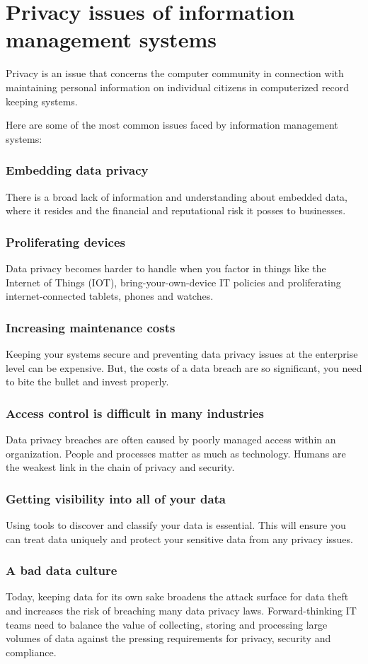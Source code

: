 \documentclass[twocolumn, 12pt, a4paper]{article}
\begin{document}
\section{Privacy issues of information management systems}
Privacy is an issue that concerns the computer community in connection with
maintaining personal information on individual citizens in computerized record
keeping systems.

Here are some of the most common issues faced by information management
systems:
\subsubsection{Embedding data privacy}
There is a broad lack of information and understanding about embedded
data, where it resides and the financial and reputational risk it posses
to businesses.
\subsubsection{Proliferating devices}
Data privacy becomes harder to handle when you factor in things like the
Internet of Things (IOT), bring-your-own-device IT policies and proliferating
internet-connected tablets, phones and watches.
\subsubsection{Increasing maintenance costs}
Keeping your systems secure and preventing data privacy issues at the
enterprise level can be expensive. But, the costs of a data breach are so
significant, you need to bite the bullet and invest properly.
\subsubsection{Access control is difficult in many industries}
Data privacy breaches are often caused by poorly managed access within an
organization. People and processes matter as much as technology. Humans are
the weakest link in the chain of privacy and security.
\subsubsection{Getting visibility into all of your data}
Using tools to discover and classify your data is essential. This will ensure
you can treat data uniquely and protect your sensitive data from any privacy
issues.
\subsubsection{A bad data culture}
Today, keeping data for its own sake broadens the attack surface for data
theft and increases the risk of breaching many data privacy laws.
Forward-thinking IT teams need to balance the value of collecting, storing and
processing large volumes of data against the pressing requirements for
privacy, security and compliance.
\end{document}
